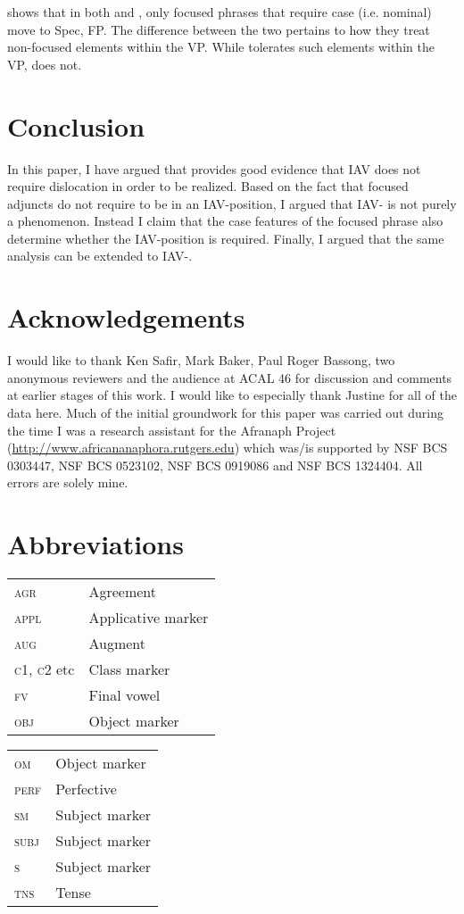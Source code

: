 \documentclass[output=paper,newtxmath,modfonts,nonflat,hidelinks]{langsci/langscibook}
\begin{document}
 shows that in both  and , only focused phrases that require case (i.e. nominal) move to Spec, FP. The difference between the two pertains to how they treat non-focused elements within the VP. While  tolerates such elements within the VP,  does not. 

\section{Conclusion}\label{sec:selvanathan:7}
In this paper, I have argued that  provides good evidence that IAV  does not require dislocation in order to be realized. Based on the fact that  focused adjuncts do not require to be in an IAV-position, I argued that IAV- is not purely a  phenomenon. Instead I claim that the case features of the focused phrase also determine whether the IAV-position is required. Finally, I argued that the same analysis can be extended to  IAV-.

\section*{Acknowledgements}
I would like to thank Ken Safir, Mark Baker, Paul Roger Bassong, two anonymous reviewers and the audience at ACAL 46 for discussion and comments at earlier stages of this work. I would like to especially thank Justine  for all of the  data here. Much of the initial groundwork for this paper was carried out during the time I was a research assistant for the Afranaph Project (\url{http://www.africananaphora.rutgers.edu}) which was\slash is supported by NSF BCS 0303447, NSF BCS 0523102, NSF BCS 0919086 and NSF BCS 1324404. All errors are solely mine.

\section*{Abbreviations}
\begin{tabularx}{.5\textwidth}{@{}lQ}
\textsc{agr} & Agreement\\
\textsc{appl} & Applicative marker\\
\textsc{aug} & Augment\\
\textsc{c1, c2} etc & Class marker\\
\textsc{fv} & Final vowel\\
\textsc{obj} & Object marker\\
\end{tabularx}%
\begin{tabularx}{.5\textwidth}{lQ@{}}
\textsc{om} & Object marker\\
\textsc{perf} & Perfective\\
\textsc{sm} & Subject marker\\
\textsc{subj} & Subject marker\\
\textsc{s} & Subject marker\\
\textsc{tns} & Tense\\
\end{tabularx}
\end{document}
